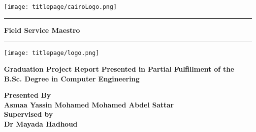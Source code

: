 \documentclass[12pt,a4paper]{report}
\begin{document}
\newcommand{\HRule}{\rule{\linewidth}{0.5mm}}
\begin{titlepage}
	\begin{center}
			\centering
			\texttt{[image: titlepage/cairoLogo.png]}

		\Huge
		\HRule
		
		\textbf{Field Service Maestro}
		\HRule
		
		\vspace*{0.5cm}
		\centering
		\texttt{[image: titlepage/logo.png]}
		
		\vspace*{.5cm}
		\Large
		\textbf{ Graduation Project Report Presented in
Partial Fulfillment of the B.Sc. Degree in Computer Engineering}

		\large
		\vspace*{1.5cm}
		{\textbf{Presented By}}\\
		\Large \textbf{
		{Asmaa Yassin Mohamed}
		\hfill
		{Mohamed Abdel Sattar}\\
		}
		\vspace*{1.5cm}
		{\textbf {\large Supervised by}}\\
		\textbf{\LARGE Dr Mayada Hadhoud}\\
		\vfill
		{\textbf{\the \year}}
	\end{center}
\end{titlepage}
\end{document}
